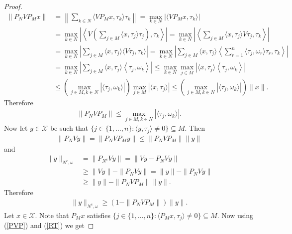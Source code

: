 \documentclass{amsart}
\begin{document}
\begin{proof}
\begin{align*}
	\|P_NVP_Mx\|&=\left\|\sum_{k\in N}\langle VP_Mx, \tau_k\rangle \tau_k\right\|=\displaystyle \max_{k \in N}|\langle VP_Mx, \tau_k\rangle|\\
	&=\displaystyle \max_{k \in N}\left|\left\langle V\left(\sum_{j \in M}\langle x, \tau_j\rangle \tau_j\right), \tau_k\right\rangle\right|=\displaystyle \max_{k \in N}\left|\left\langle \sum_{j \in M}\langle x, \tau_j\rangle V\tau_j, \tau_k\right\rangle\right|\\
	&=\displaystyle \max_{k \in N}\left| \sum_{j \in M}\langle x, \tau_j\rangle \langle V\tau_j, \tau_k\rangle\right|=\displaystyle \max_{k \in N}\left| \sum_{j \in M}\langle x, \tau_j\rangle \left\langle \sum_{r=1}^{n}\langle \tau_j, \omega_r\rangle \tau_r, \tau_k\right\rangle\right|\\
	&=\displaystyle \max_{k \in N}\left| \sum_{j \in M}\langle x, \tau_j\rangle \left\langle \tau_j, \omega_k\right\rangle\right|\leq \displaystyle \max_{k \in N}\max_{j \in M}|\langle x, \tau_j\rangle \left\langle \tau_j, \omega_k\right\rangle|\\
	&\leq \left(\displaystyle \max_{j \in M, k \in N}|\langle \tau_j, \omega_k \rangle|\right) \max_{j \in M}|\langle x, \tau_j\rangle|\leq \left(\displaystyle \max_{j \in M, k \in N}|\langle \tau_j, \omega_k \rangle|\right)\|x\|.
\end{align*}
Therefore 
\begin{align}\label{PVP}
	\|P_NVP_M\|\leq \displaystyle \max_{j \in M, k \in N}|\langle \tau_j, \omega_k \rangle|.
\end{align}
Now let $y \in \mathcal{X}$ be such that $\{j \in \{1, \dots, n\}: \langle y, \tau_j \rangle \neq 0\} \subseteq M.$
Then 
\begin{align*}
\|P_NVy\|=\|P_NVP_My\|\leq \|P_NVP_M\|\|y\|	
\end{align*}
 and 
\begin{align*}
	\|y\|_{N^c, \omega}&=\|P_{N^c}Vy\|=\|Vy-P_NVy\|\\
	&\geq \|Vy\|-\|P_NVy\|=\|y\|-\|P_NVy\| \\
	&\geq \|y\|-\|P_NVP_M\|\|y\|.
\end{align*}
Therefore 
\begin{align}\label{RT}
	\|y\|_{N^c, \omega}\geq (1-\|P_NVP_M\|)\|y\|.
\end{align}
Let $x \in \mathcal{X}$.   Note that $P_Mx$ satisfies $	\{j \in \{1, \dots, n\}: \langle P_Mx, \tau_j\rangle \neq 0\} \subseteq M.$ Now using (\ref{PVP}) and  (\ref{RT}) we get 


\end{proof}
\end{document}
